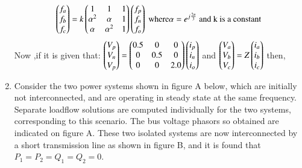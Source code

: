 \documentclass[journal,,12pt,onecolumn]{IEEEtran}
\theoremstyle{remark}
\begin{document}
\begin{enumerate}
\begin{align*}
    \begin{pmatrix}f_a\\f_b\\f_c\end{pmatrix}=k\begin{pmatrix}1&1&1\\{\alpha}^2&\alpha&1\\\alpha&{\alpha}^2&1\end{pmatrix}\begin{pmatrix}f_p\\f_n\\f_o\end{pmatrix}\text{ where} \alpha=e^{j\frac{2\pi}{3}} \text{ and k is a constant}
\end{align*}
Now ,if it is given that: $\begin{pmatrix}V_p\\V_n\\V_p\end{pmatrix}=\begin{pmatrix}0.5&0&0\\0&0.5&0\\0&0&2.0\end{pmatrix}\begin{pmatrix}i_p\\i_n\\i_o\end{pmatrix}$ and $\begin{pmatrix}V_a\\V_b\\V_c\end{pmatrix}=Z\begin{pmatrix}i_a\\i_b\\i_c\end{pmatrix}$ then, 
\begin{enumerate}
\end{enumerate}
\bigskip
\item Consider the two power systems shown in figure A below, which are initially not interconnected, and are operating in steady state at the same frequency. Separate loadflow solutions are computed individually for the two systems, corresponding to this scenario. The bus voltage phasors so obtained are indicated on figure A. These two isolated systems are now interconnected by a short transmission line as shown in figure B, and it is  found that $P_1=P_2=Q_1=Q_2=0$.

\end{enumerate}
\end{document}
